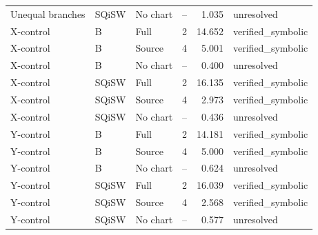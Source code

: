 \begin{center}
\begin{tabular}{lllrrl}
Unequal branches & SQiSW & No chart & -- & 1.035 & unresolved\\
X-control & B & Full & 2 & 14.652 & verified\_symbolic\\
X-control & B & Source & 4 & 5.001 & verified\_symbolic\\
X-control & B & No chart & -- & 0.400 & unresolved\\
X-control & SQiSW & Full & 2 & 16.135 & verified\_symbolic\\
X-control & SQiSW & Source & 4 & 2.973 & verified\_symbolic\\
X-control & SQiSW & No chart & -- & 0.436 & unresolved\\
Y-control & B & Full & 2 & 14.181 & verified\_symbolic\\
Y-control & B & Source & 4 & 5.000 & verified\_symbolic\\
Y-control & B & No chart & -- & 0.624 & unresolved\\
Y-control & SQiSW & Full & 2 & 16.039 & verified\_symbolic\\
Y-control & SQiSW & Source & 4 & 2.568 & verified\_symbolic\\
Y-control & SQiSW & No chart & -- & 0.577 & unresolved\\
\bottomrule\end{tabular}\end{center}
